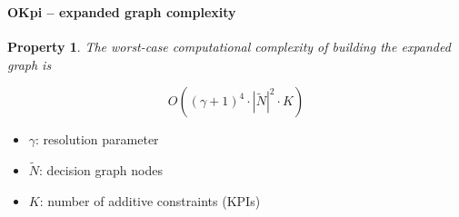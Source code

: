 \documentclass[aspectratio=169]{beamer}
\newcounter{dummy}
\newtheorem{property}[dummy]{Property}
\begin{document}
\begin{frame}
    \frametitle{\secname}
    \framesubtitle{OKpi -- expanded graph complexity}

    \begin{property}
        \label{prop:graphcomp}
        The worst-case computational complexity of building the
        expanded graph is 

        \begin{equation}
            \mbox{$O\left((\gamma+1)^4\cdot|\widetilde{N}|^2\cdot K\right)$}
        \end{equation}
    \end{property}
    \begin{itemize}
        \item $\gamma$: resolution parameter
        \item $\widetilde{N}$: decision graph nodes
        \item $K$: number of additive constraints (KPIs)
    \end{itemize}
\end{frame}


\end{document}
